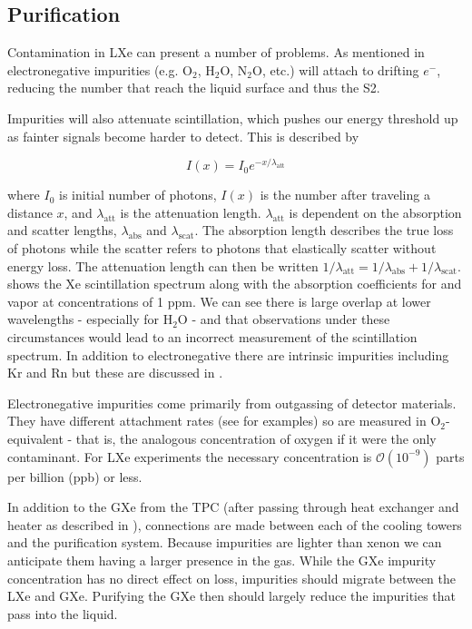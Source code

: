 \subsection{Purification}
\label{subsec:xenon1t_pur}
Contamination in LXe can present a number of problems.  As mentioned in  electronegative
impurities (e.g. O$_2$, H$_2$O, N$_2$O, etc.) will attach to drifting $e^-$, reducing the number that reach
the liquid surface and thus the S2.

Impurities will also attenuate scintillation, which pushes our energy threshold up as fainter signals become harder to detect.  This is
described by

\begin{equation}
I(x) = I_0 e^{-x / \lambda_{\mathrm{att}}}
\label{eq:xenon1t_pur_atten}
\end{equation}

where $I_0$ is initial number of photons, $I(x)$ is the number after traveling a distance $x$, and $\lambda_{\mathrm{att}}$ is the
attenuation length.  $\lambda_{\mathrm{att}}$ is dependent on the absorption and scatter lengths, $\lambda_{\mathrm{abs}}$ and
$\lambda_{\mathrm{scat}}$.  The absorption length describes the true loss of photons while the scatter refers to photons that elastically
scatter without energy loss.  The attenuation length can then be written
$1 / \lambda_{\mathrm{att}} = 1 / \lambda_{\mathrm{abs}} + 1 / \lambda_{\mathrm{scat}}$.   shows
the Xe scintillation spectrum along with the absorption coefficients for \otwo and \htwoo vapor at concentrations of 1 ppm.  We can see
there is large overlap at lower wavelengths - especially for H$_2$O - and that observations under these circumstances would lead to an
incorrect measurement of the scintillation spectrum.  In addition to electronegative there are intrinsic
impurities including Kr and Rn but these are discussed in .

Electronegative impurities come primarily from outgassing of detector materials.  They have different \electron attachment rates (see
 for examples) so are measured in O$_2$-equivalent - that is, the analogous concentration of oxygen if it
were the only contaminant.  For LXe experiments the necessary concentration is $\mathcal{O}(10^{-9})$ parts per billion (ppb) or less.

In addition
to the GXe from the TPC (after passing through heat exchanger and heater as described in ), connections are
made between
each of the cooling towers and the purification system.  Because impurities are lighter than xenon we can anticipate them having a larger
presence in the gas.  While the GXe impurity concentration has no direct effect on \electron loss, impurities should migrate between the
LXe and GXe.  Purifying the GXe then should largely reduce the impurities that pass into the liquid.

